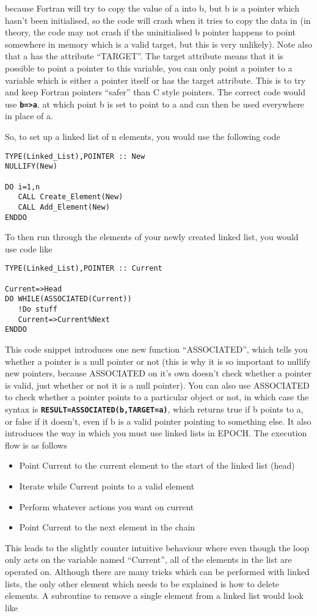 \documentclass[12pt]{article}
\newcommand{\simpleboxverbatim}{\begin{Verbatim}[obeytabs=true,frame=single,
  framerule=0.5mm,rulecolor=\color{warwickmid}]}
\newcommand{\inlinecode}[1]{{\color{warwickred} \bf\texttt{#1}}}
\newcommand{\nEPOCH}{{\color{warwickdark}\fontfamily{phv}\selectfont EPOCH}}
\begin{document}
because Fortran will try to copy the value of a into b, but b is a pointer
which hasn't been initialised, so the code will crash when it tries to copy
the data in (in theory, the code may not crash if the uninitialised b pointer
happens to point somewhere in memory which is a valid target, but this is very
unlikely). Note also that a has the attribute ``TARGET''. The target attribute
means that it is possible to point a pointer to this variable, you can only
point a pointer to a variable which is either a pointer itself or has the
target attribute. This is to try and keep Fortran pointers ``safer'' than C
style pointers. The correct code would use \inlinecode{b=>a}, at which point b
is set to point to a and can then be used everywhere in place of a.

So, to set up a linked list of n elements, you would use the following code

\simpleboxverbatim
TYPE(Linked_List),POINTER :: New
NULLIFY(New)

DO i=1,n
   CALL Create_Element(New)
   CALL Add_Element(New)
ENDDO
\end{Verbatim}

To then run through the elements of your newly created linked list, you would
use code like
\simpleboxverbatim
TYPE(Linked_List),POINTER :: Current

Current=>Head
DO WHILE(ASSOCIATED(Current))
   !Do stuff
   Current=>Current%
ENDDO
\end{Verbatim}

This code snippet introduces one new function ``ASSOCIATED'', which tells you
whether a pointer is a null pointer or not (this is why it is so important to
nullify new pointers, because ASSOCIATED on it's own doesn't check whether a
pointer is valid, just whether or not it is a null pointer). You can also use
ASSOCIATED to check whether a pointer points to a particular object or not, in
which case the syntax is \inlinecode{RESULT=ASSOCIATED(b,TARGET=a)}, which
returns true if b points to a, or false if it doesn't, even if b is a valid
pointer pointing to something else. It also introduces the way in which you
must use linked lists in \nEPOCH. The execution flow is as follows
\begin{itemize}
\item Point Current to the current element to the start of the linked list
  (head)
\item Iterate while Current points to a valid element
\item Perform whatever actions you want on current
\item Point Current to the next element in the chain
\end{itemize}
This leads to the slightly counter intuitive behaviour where even though the
loop only acts on the variable named ``Current'', all of the elements in the
list are operated on. Although there are many tricks which can be performed
with linked lists, the only other element which needs to be explained is how
to delete elements. A subroutine to remove a single element from a linked list
would look like
\end{document}
